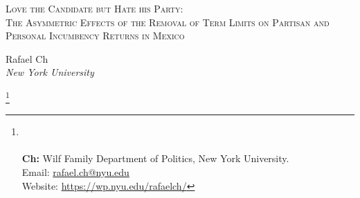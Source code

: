 \documentclass[12pt]{amsart}
\title{}
\numberwithin{equation}{section}
\theoremstyle{definition}
\theoremstyle{definition}
\theoremstyle{definition}
\begin{document}
	\vspace*{3ex minus 1ex}
	\begin{center}
		\Large \textsc{Love the Candidate but Hate his Party: \\  The Asymmetric Effects of the Removal of Term Limits on Partisan and Personal Incumbency Returns in Mexico}
	\end{center}
	
	
\date{May 28, 2021} 
\vspace*{3ex minus 1ex}
	\begin{center}
		Rafael Ch\\
		
		\textit{New York University}\\
		
	\end{center}
	 
	\thanks{%
	\\
	 \\ \textbf{Ch:} Wilf Family Department of Politics, New York University. \\ Email: \url{rafael.ch@nyu.edu}
	 \\ Website: \url{https://wp.nyu.edu/rafaelch/}}
		  
\end{document}
